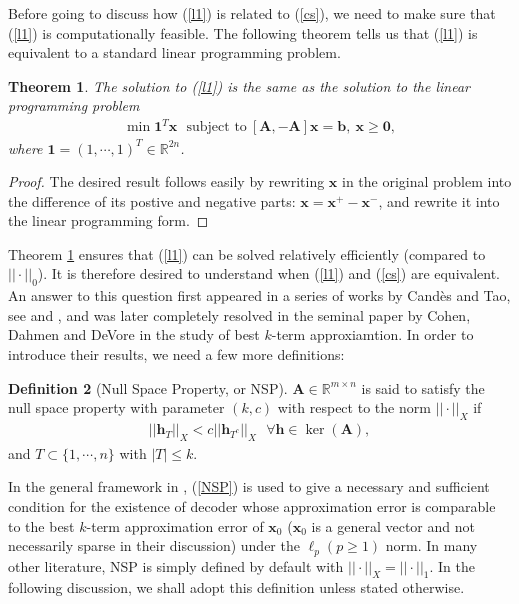 \documentclass[11pt]{article}
\numberwithin{equation}{section}
\theoremstyle{plain}
\newtheorem{Th}{Theorem}[section]
\theoremstyle{definition}
\newtheorem{Def}[Th]{Definition}
\def\R{{\mathbb R}}
\def\R{{\mathbb R}}
\def\A{{\mathbf A}}
\def\x{{\mathbf x}}
\def\b{{\mathbf b}}
\def\h{{\mathbf{h}}}
\begin{document}
Before going to discuss how (\ref{l1}) is related to (\ref{cs}), we need to make sure that (\ref{l1}) is computationally feasible. The following theorem tells us that (\ref{l1}) is equivalent to a standard linear programming problem. 

\begin{Th}\label{Linear programming}
The solution to (\ref{l1}) is the same as the solution to the linear programming problem
\begin{align}
\min \mathbf{1}^T\x \ \ \ \text{subject to}\ [\A, -\A]\x=\b, \ \x\geq \mathbf{0},\label{l1-LP}
\end{align}
where $\mathbf{1}=(1, \cdots, 1)^T\in\R^{2n}$. 
\end{Th}
\begin{proof}
The desired result follows easily by rewriting $\x$ in the original problem into the difference of its postive and negative parts: $\x=\x^+-\x^-$, and rewrite it into the linear programming form.   
\end{proof}

Theorem \ref{Linear programming} ensures that (\ref{l1}) can be solved relatively efficiently (compared to $|| \cdot||_0$). It is therefore desired to understand when (\ref{l1}) and (\ref{cs}) are equivalent. An answer to this question first appeared in a series of works by Cand\`es and Tao, see \cite{emmanuel2004robust} and \cite{candes2004near}, and was later completely resolved in the seminal paper \cite{cohen2009compressed} by Cohen, Dahmen and DeVore in the study of best $k$-term approxiamtion. In order to introduce their results, we need a few more definitions:

\begin{Def}[Null Space Property, or NSP]
$\A\in\R^{m\times n}$ is said to satisfy the null space property with parameter $(k, c)$ with respect to the norm $|| \cdot||_X$ if 
\begin{align}
||\h_T||_X< c||\h_{T^c}||_X\ \ \ \forall \h\in\ker(\A),\label{NSP}
\end{align}
and $T\subset\{1,\cdots, n\}$ with $|T|\leq k$.  
\end{Def}
In the general framework in \cite{cohen2009compressed}, (\ref{NSP}) is used to give a necessary and sufficient condition for the existence of decoder whose approximation error is comparable to the best $k$-term approximation error of $\x_0$ ($\x_0$ is a general vector and not necessarily sparse in their discussion) under the $\ell_p (p\geq 1)$ norm. In many other literature, NSP is simply defined by default with $|| \cdot||_X=|| \cdot||_1$. In the following discussion, we shall adopt this definition unless stated otherwise.  
\end{document}
